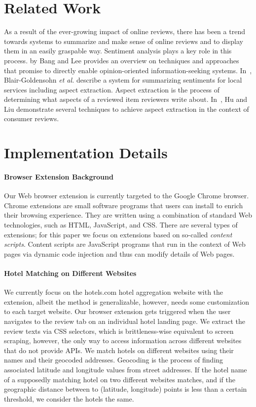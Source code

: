 \documentclass[runningheads,a4paper]{llncs}
\begin{document}
\section{Related Work}
As a result of the ever-growing impact of online reviews, there has been a trend towards systems to summarize and make sense of online reviews and to display them in an easily graspable way. Sentiment analysis plays a key role in this process. \cite{pang2008} by Bang and Lee provides an overview on techniques and approaches that promise to directly enable opinion-oriented information-seeking systems. In~\cite{blairgoldensohn2011}, Blair-Goldensohn \emph{et al.} describe a system for summarizing sentiments for local services including aspect extraction. Aspect extraction is the process of determining what aspects of a reviewed item reviewers write about. In~\cite{hu2004}, Hu and Liu demonstrate several techniques to achieve aspect extraction in the context of consumer reviews.

\section{Implementation Details}
\paragraph{Browser Extension Background}
Our Web browser extension is currently targeted to the Google Chrome browser. Chrome extensions are small software programs that users can install to enrich their browsing experience. They are written using a combination of standard Web technologies, such as HTML, JavaScript, and CSS. There are several types of extensions; for this paper we focus on extensions based on so-called \emph{content scripts}. Content scripts are JavaScript programs that run in the context of Web pages via dynamic code injection and thus can modify details of Web pages.

\paragraph{Hotel Matching on Different Websites}
We currently focus on the hotels.com hotel aggregation website with the extension, albeit the method is generalizable, however, needs some customization to each target website. Our browser extension gets triggered when the user navigates to the review tab on an individual hotel landing page. We extract the review texts via CSS selectors, which is brittleness-wise equivalent to screen scraping, however, the only way to access information across different websites that do not provide APIs. We match hotels on different websites using their names and their geocoded addresses. Geocoding is the process of finding associated latitude and longitude values from street addresses. If the hotel name of a supposedly matching hotel on two different websites matches, and if the geographic distance between to (latitude, longitude) points is less than a certain threshold, we consider the hotels the same.
\end{document}

